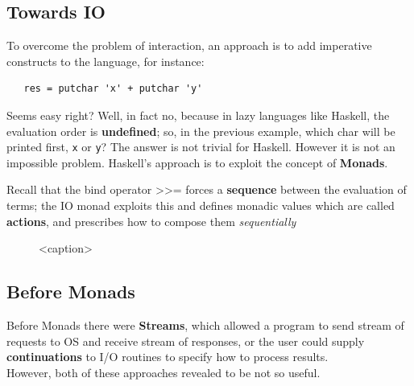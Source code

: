 \subsection{Towards IO}
To overcome the problem of interaction, an approach is to add imperative constructs to the language,
for instance:
\begin{lstlisting}
   res = putchar 'x' + putchar 'y'
\end{lstlisting}
Seems easy right?
Well, in fact no, because in lazy languages like Haskell,
the evaluation order is \textbf{undefined};
so, in the previous example, which char will be printed first, \lstinline|x| or \lstinline|y|?
The answer is not trivial for Haskell.
However it is not an impossible problem.
Haskell's approach is to exploit the concept of \textbf{Monads}.

Recall that the bind operator >>= forces a \textbf{sequence} between the evaluation of terms;
the IO monad exploits this and defines monadic values which are called \textbf{actions}, and prescribes how to compose
them \textit{sequentially}

\begin{figure}[htbp]
   \centering
   \caption{<caption>}
   \label{<label>}
\end{figure}

\subsection*{Before Monads}
Before Monads there were \textbf{Streams}, which allowed a program to send stream of requests to OS and receive stream of responses,
or the user could supply \textbf{continuations} to I/O routines
to specify how to process results.\\
However, both of these approaches revealed to be not so useful.

